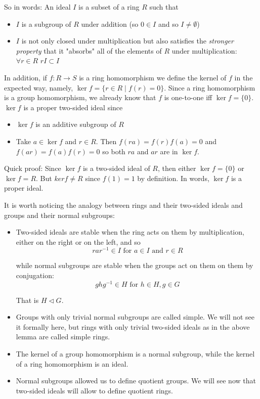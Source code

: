 \documentclass[11pt, oneside]{article}   	%
\theoremstyle{definition}
\begin{document}
\bigskip
\noindent
So in words: An ideal $I$ is a subset of a ring $R$ such that

\begin{itemize}
\item $I$ is a subgroup of $R$ under addition (so $0 \in I$ and so $I \neq \emptyset$) 
\item $I$  is not only closed under multiplication but also satisfies the \emph{stronger property} that it  
"absorbs" all of the elements of $R$ under multiplication: $\forall r \in R$ $rI \subset I$
\end{itemize}

\bigskip
\noindent
In addition, if $f : R \rightarrow S$ is a ring homomorphism we define the kernel of $f$ in the expected way, namely,  $\ker f = \{r \in R \mid f(r) = 0\}$. Since 
a ring homomorphism is a group homomorphism, we already know that $f$ is one-to-one iff $\ker f = \{0\}$.  $\ker f$ is a proper two-sided ideal since

\begin{itemize}
\item $\ker f$ is an additive subgroup of $R$
\item Take $a \in \ker f$ and $r \in R$. Then $f(ra) = f(r)f(a) = 0$ and $f(ar) = f(a)f(r) = 0$ so both $ra$ and $ar$ are in $\ker f$.
\end{itemize}

\noindent
Quick proof:  Since $\ker f$ is a two-sided ideal of $R$, then either $\ker f = \{0\}$ or $\ker f = R$.
But $ker f \neq R$ since $f(1) = 1 $ by definition. In words, $\ker f$ is a proper ideal.

\bigskip
\noindent
It is worth noticing the analogy between rings and their two-sided ideals and groups and their normal subgroups:

\begin{itemize}
\item Two-sided ideals are stable when the ring acts on them by multiplication, either on the right or on the left, and so
\begin{equation*}
rar^{-1} \in I \text{ for }a \in I \text{ and } r \in R
\end{equation*}

\noindent
while normal subgroups are stable when the groups act on them on them by conjugation:
\begin{equation*}
ghg^{-1} \in H \text{ for } h \in H, g \in G
\end{equation*}

\noindent
That is  $H \lhd G$.
\item Groups with only trivial normal subgroups are called simple. We will not see it formally here, but rings with only trivial two-sided ideals 
as in the above lemma are called simple rings.
\item The kernel of a group homomorphism is a normal subgroup, while the kernel of a ring homomorphism is an ideal.
\item Normal subgroups allowed us to define quotient groups. We will see now that two-sided ideals will allow to define quotient rings.
\end{itemize}
\end{document}

